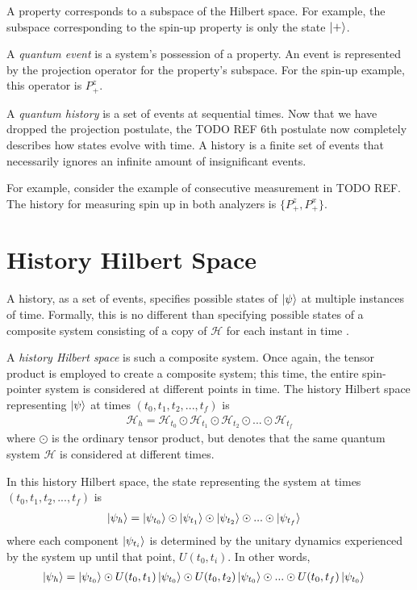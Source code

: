 A property corresponds to a subspace of the Hilbert space. For example, the subspace corresponding to the spin-up property is only the state $\ket{+}$.

A \textit{quantum event} is a system's possession of a property. An event is represented by the projection operator for the property's subspace. For the spin-up example, this operator is $P^z_+$.

A \textit{quantum history} is a set of events at sequential times. Now that we have dropped the projection postulate, the TODO REF 6th postulate now completely describes how states evolve with time. A history is a finite set of events that necessarily ignores an infinite amount of insignificant events.

For example, consider the example of consecutive measurement in TODO REF. The history for measuring spin up in both analyzers is $\{P^z_+, P^x_+\}$.

\section{History Hilbert Space}
A history, as a set of events, specifies possible states of $\ket{\psi}$ at multiple instances of time. Formally, this is no different than specifying possible states of a composite system consisting of a copy of $\mathcal{H}$ for each instant in time \cite{Griffiths}.

A \textit{history Hilbert space} is such a composite system. Once again, the tensor product is employed to create a composite system; this time, the entire spin-pointer system is considered at different points in time. The history Hilbert space representing $\ket{\psi}$ at times $\left(t_0, t_1, t_2, ..., t_f \right)$ is
\begin{align}
  {\mathcal{H}}_h = \mathcal{H}_{t_0} \odot \mathcal{H}_{t_1} \odot \mathcal{H}_{t_2} \odot ... \odot \mathcal{H}_{t_f}
\end{align}
where $\odot$ is the ordinary tensor product, but denotes that the same quantum system $\mathcal{H}$ is considered at different times.

In this history Hilbert space, the state representing the system at times $\left(t_0, t_1, t_2, ..., t_f \right)$ is
\begin{align}
  \ket{\psi_h} &= \ket{\psi_{t_0}} \odot \ket{\psi_{t_1}} \odot \ket{\psi_{t_2}} \odot ... \odot \ket{\psi_{t_f}}
\end{align}
where each component $\ket{\psi_{t_i}}$ is determined by the unitary dynamics experienced by the system up until that point, $U(t_0, t_i)$. In other words,
\begin{align}
  \ket{\psi_h} &= \ket{\psi_{t_0}} \odot U(t_0, t_1)\ket{\psi_{t_0}} \odot U(t_0, t_2)\ket{\psi_{t_0}} \odot ... \odot U(t_0, t_f)\ket{\psi_{t_0}}
\end{align}

